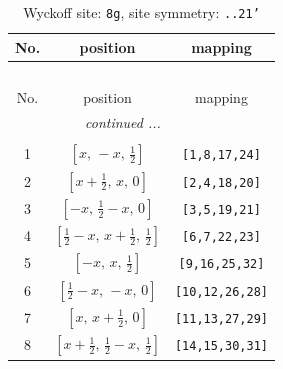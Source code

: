 \documentclass[fleqn,8pt]{jsarticle}
\begin{document}
\begin{longtable}{ccc}
\caption{Wyckoff site: {\tt 8g}, site symmetry: {\tt ..21'}}
 \\
 \hline \hline
No. & position & mapping \\ \hline \endfirsthead

\multicolumn{2}{l}{\tablename\ \thetable{}} \\
 \hline \hline
No. & position & mapping \\ \hline \endhead

 \hline \hline
\multicolumn{2}{r}{\footnotesize\it continued ...} \\ \endfoot

 \hline \hline
\multicolumn{2}{r}{} \\ \endlastfoot

1 & $\left[ x,\, - x,\, \frac{1}{2} \right]$ & {\tt [1,8,17,24]} \\ \hline
2 & $\left[ x + \frac{1}{2},\, x,\, 0 \right]$ & {\tt [2,4,18,20]} \\ \hline
3 & $\left[ - x,\, \frac{1}{2} - x,\, 0 \right]$ & {\tt [3,5,19,21]} \\ \hline
4 & $\left[ \frac{1}{2} - x,\, x + \frac{1}{2},\, \frac{1}{2} \right]$ & {\tt [6,7,22,23]} \\ \hline
5 & $\left[ - x,\, x,\, \frac{1}{2} \right]$ & {\tt [9,16,25,32]} \\ \hline
6 & $\left[ \frac{1}{2} - x,\, - x,\, 0 \right]$ & {\tt [10,12,26,28]} \\ \hline
7 & $\left[ x,\, x + \frac{1}{2},\, 0 \right]$ & {\tt [11,13,27,29]} \\ \hline
8 & $\left[ x + \frac{1}{2},\, \frac{1}{2} - x,\, \frac{1}{2} \right]$ & {\tt [14,15,30,31]} \\
\end{longtable}
\renewcommand{\arraystretch}{1.2}
\end{document}
